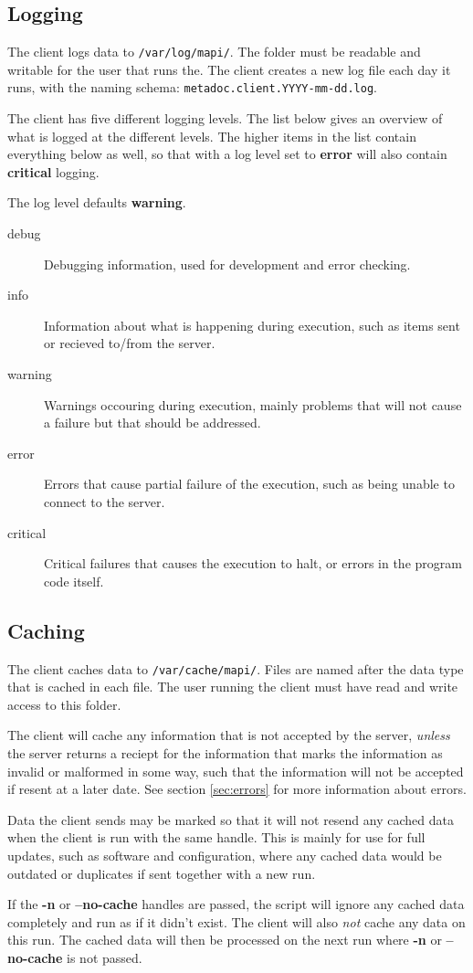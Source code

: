 \subsection{Logging}
\label{sec:logging}
The client logs data to \texttt{/var/log/mapi/}. The folder must be readable
and writable for the user that runs the.  The client creates a new log file
each day it runs, with the naming schema:
\texttt{metadoc.client.YYYY-mm-dd.log}. 

The client has five different logging levels. The list below gives an overview
of what is logged at the different levels. The higher items in the list contain
everything below as well, so that with a log level set to \textbf{error} will
also contain \textbf{critical} logging.

The log level defaults \textbf{warning}. 

\begin{description}
    \item[debug]    Debugging information, used for development and error
    checking.
    \item[info] Information about what is happening during execution, such as
    items sent or recieved to/from the server.
    \item[warning]  Warnings occouring during execution, mainly problems that
    will not cause a failure but that should be addressed.
    \item[error]    Errors that cause partial failure of the execution, such as
    being unable to connect to the server.
    \item[critical] Critical failures that causes the execution to halt, or
    errors in the program code itself.
\end{description}

\subsection{Caching}
\label{sec:caching}
The client caches data to \texttt{/var/cache/mapi/}. Files are named after the
data type that is cached in each file. The user running the client must have
read and write access to this folder. 

The client will cache any information that is not accepted by the server, 
\textit{unless} the server returns a reciept for the information that marks the 
information as invalid or malformed in some way, such that the information will 
not be accepted if resent at a later date. See section \ref{sec:errors} for
more information about errors.

Data the client sends may be marked so that it will not resend any cached data
when the client is run with the same handle. This is mainly for use for full
updates, such as software and configuration, where any cached data would be
outdated or duplicates if sent together with a new run.

If the \textbf{-n} or \textbf{--no-cache} handles are passed, the script will
ignore any cached data completely and run as if it didn't exist. The client
will also \textit{not} cache any data on this run. The cached data will then be
processed on the next run where \textbf{-n} or \textbf{--no-cache} is not
passed. 
